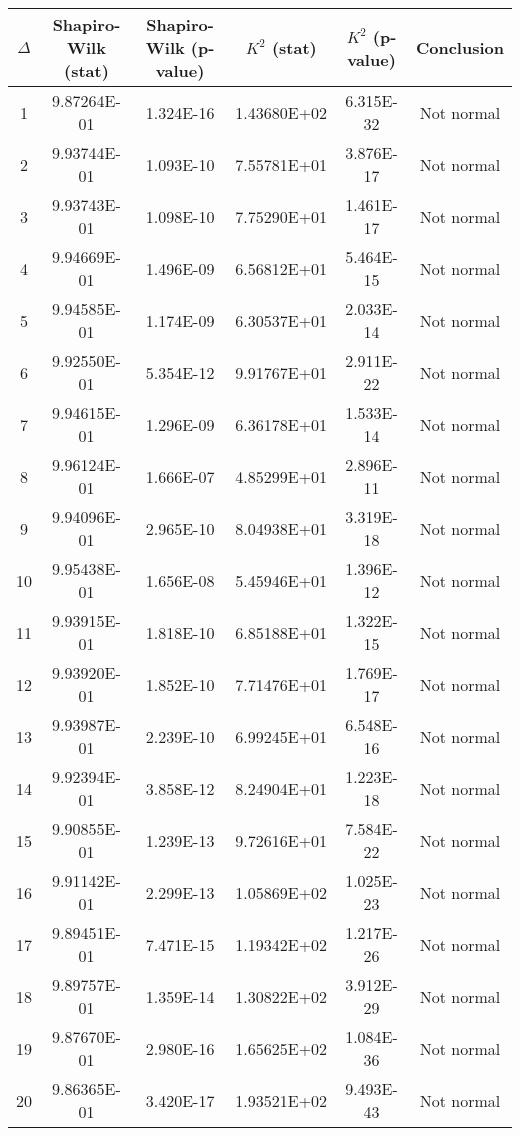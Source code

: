 \begin{table}[h]
	\begin{tabular}{|c|c|c|c|c|c|}
		\hline
		$\Delta$ &  Shapiro-Wilk (stat) & Shapiro-Wilk (p-value) & $K^2$ (stat) & $K^2$ (p-value) & Conclusion\\\hline
		\hline
		1 & 9.87264E-01 & 1.324E-16 & 1.43680E+02 & 6.315E-32 & Not normal\\\hline
		2 & 9.93744E-01 & 1.093E-10 & 7.55781E+01 & 3.876E-17 & Not normal\\\hline
		3 & 9.93743E-01 & 1.098E-10 & 7.75290E+01 & 1.461E-17 & Not normal\\\hline
		4 & 9.94669E-01 & 1.496E-09 & 6.56812E+01 & 5.464E-15 & Not normal\\\hline
		5 & 9.94585E-01 & 1.174E-09 & 6.30537E+01 & 2.033E-14 & Not normal\\\hline
		6 & 9.92550E-01 & 5.354E-12 & 9.91767E+01 & 2.911E-22 & Not normal\\\hline
		7 & 9.94615E-01 & 1.296E-09 & 6.36178E+01 & 1.533E-14 & Not normal\\\hline
		8 & 9.96124E-01 & 1.666E-07 & 4.85299E+01 & 2.896E-11 & Not normal\\\hline
		9 & 9.94096E-01 & 2.965E-10 & 8.04938E+01 & 3.319E-18 & Not normal\\\hline
		10 & 9.95438E-01 & 1.656E-08 & 5.45946E+01 & 1.396E-12 & Not normal\\\hline
		11 & 9.93915E-01 & 1.818E-10 & 6.85188E+01 & 1.322E-15 & Not normal\\\hline
		12 & 9.93920E-01 & 1.852E-10 & 7.71476E+01 & 1.769E-17 & Not normal\\\hline
		13 & 9.93987E-01 & 2.239E-10 & 6.99245E+01 & 6.548E-16 & Not normal\\\hline
		14 & 9.92394E-01 & 3.858E-12 & 8.24904E+01 & 1.223E-18 & Not normal\\\hline
		15 & 9.90855E-01 & 1.239E-13 & 9.72616E+01 & 7.584E-22 & Not normal\\\hline
		16 & 9.91142E-01 & 2.299E-13 & 1.05869E+02 & 1.025E-23 & Not normal\\\hline
		17 & 9.89451E-01 & 7.471E-15 & 1.19342E+02 & 1.217E-26 & Not normal\\\hline
		18 & 9.89757E-01 & 1.359E-14 & 1.30822E+02 & 3.912E-29 & Not normal\\\hline
		19 & 9.87670E-01 & 2.980E-16 & 1.65625E+02 & 1.084E-36 & Not normal\\\hline
		20 & 9.86365E-01 & 3.420E-17 & 1.93521E+02 & 9.493E-43 & Not normal\\\hline

\end{tabular}
\end{table}
